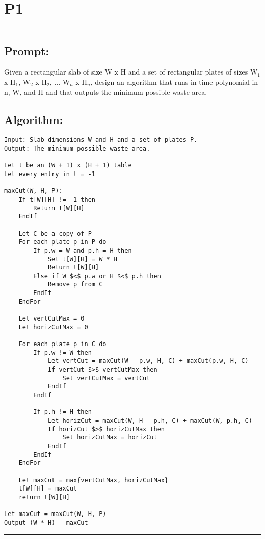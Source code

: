 \documentclass[11pt]{article}
\title{}
\author{}
\date{}
\begin{document}
\section*{P1}

\noindent\textcolor[RGB]{220,220,220}{\rule{\linewidth}{0.8pt}}

\subsection*{Prompt:} 

Given a rectangular slab of size W x H and a set of rectangular plates of sizes W$_1$ x H$_1$, W$_2$ x H$_2$, ... W$_n$ x H$_n$, design an algorithm that runs in time polynomial in n, W, and H and that outputs the minimum possible waste area. 

\subsection*{Algorithm:}

\begin{lstlisting}[basicstyle=\small, mathescape=true]
Input: Slab dimensions W and H and a set of plates P. 
Output: The minimum possible waste area. 

Let t be an (W + 1) x (H + 1) table
Let every entry in t = -1

maxCut(W, H, P):
	If t[W][H] != -1 then
		Return t[W][H]
	EndIf
	
	Let C be a copy of P
	For each plate p in P do
		If p.w = W and p.h = H then
			Set t[W][H] = W * H
			Return t[W][H]
		Else if W $<$ p.w or H $<$ p.h then
			Remove p from C
		EndIf
	EndFor
	
	Let vertCutMax = 0
	Let horizCutMax = 0
	
	For each plate p in C do
		If p.w != W then
			Let vertCut = maxCut(W - p.w, H, C) + maxCut(p.w, H, C)
			If vertCut $>$ vertCutMax then
				Set vertCutMax = vertCut
			EndIf
		EndIf
	
		If p.h != H then
			Let horizCut = maxCut(W, H - p.h, C) + maxCut(W, p.h, C)
			If horizCut $>$ horizCutMax then
				Set horizCutMax = horizCut
			EndIf
		EndIf
	EndFor
	
	Let maxCut = max{vertCutMax, horizCutMax}
	t[W][H] = maxCut
	return t[W][H]
	
Let maxCut = maxCut(W, H, P)
Output (W * H) - maxCut
\end{lstlisting}

\noindent\textcolor[RGB]{220,220,220}{\rule{\linewidth}{0.8pt}}
\linebreak
\end{document}
